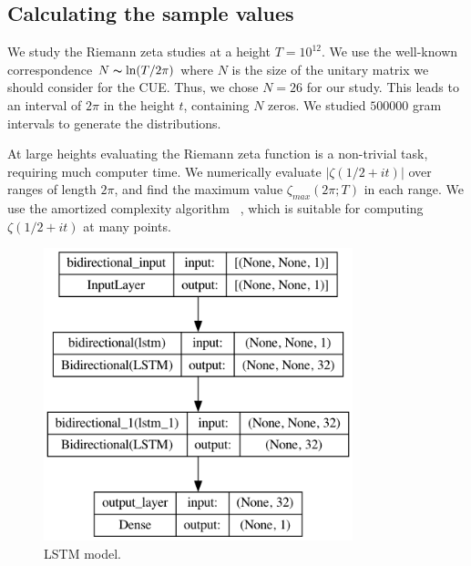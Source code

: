 \documentclass[twoside]{article}
\begin{document}
\subsection{\label{seccalc}Calculating the sample values}

We study the Riemann zeta studies  at a
height $T = 10^{12}$. We use the well-known correspondence $N \thicksim \ln(T/2\pi)$ where $N$ 
is the size of the unitary matrix we should consider for the CUE. Thus, we chose $N = 26$ for our
study.  This leads to an interval of $2\pi$ in the height $t$,  containing $N$ zeros.
We studied $500000$ gram intervals  to generate the distributions.

At large heights evaluating the Riemann zeta function  is a non-trivial task, requiring much computer time. 
We numerically evaluate $|\zeta(1/2 + it)|$ over ranges of length $2\pi$, 
 and find the maximum value $\zeta_{max}(2\pi; T )$ in each range. 
 We use the amortized complexity algorithm ~\cite{hiary}, 
 which is suitable for computing $\zeta(1/2 + it)$ at many points.

\begin{figure}
\centering
\includegraphics[width=0.8\textwidth]{2.png}
\caption[]{ 
  LSTM model. 
  }
\vspace{1mm}
\label{z2}
\end{figure}
\end{document}
